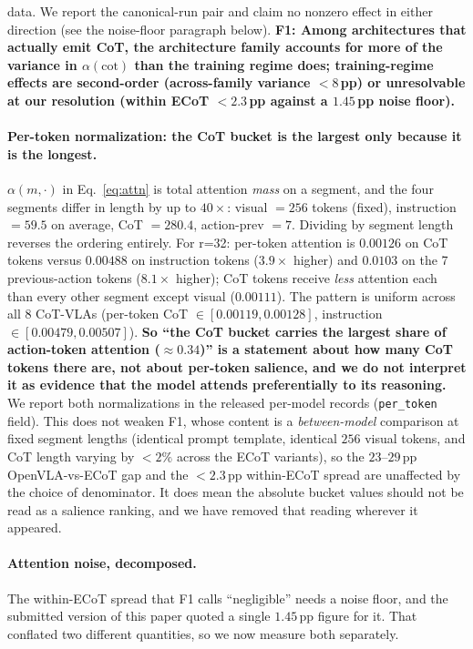 \documentclass{article}
\begin{document}
data. We report the canonical-run pair and claim no nonzero effect in either direction (see the noise-floor paragraph below). \textbf{F1: Among architectures that actually emit CoT, the architecture family accounts for more of the variance in $\alpha(\text{cot})$ than the training regime does; training-regime effects are second-order (across-family variance $<8$\,pp) or unresolvable at our resolution (within ECoT $<2.3$\,pp against a $1.45$\,pp noise floor).}

\paragraph{Per-token normalization: the CoT bucket is the largest only because it is the longest.} $\alpha(m, \cdot)$ in Eq.~\ref{eq:attn} is total attention \emph{mass} on a segment, and the four segments differ in length by up to $40\times$: visual $=256$ tokens (fixed), instruction $=59.5$ on average, CoT $=280.4$, action-prev $=7$. Dividing by segment length reverses the ordering entirely. For \mbox{r=32}: per-token attention is $0.00126$ on CoT tokens versus $0.00488$ on instruction tokens ($3.9\times$ higher) and $0.0103$ on the 7 previous-action tokens ($8.1\times$ higher); CoT tokens receive \emph{less} attention each than every other segment except visual ($0.00111$). The pattern is uniform across all 8 CoT-VLAs (per-token CoT $\in [0.00119, 0.00128]$, instruction $\in [0.00479, 0.00507]$). \textbf{So ``the CoT bucket carries the largest share of action-token attention ($\approx 0.34$)'' is a statement about how many CoT tokens there are, not about per-token salience, and we do not interpret it as evidence that the model attends preferentially to its reasoning.} We report both normalizations in the released per-model records (\texttt{per\_token} field). This does not weaken F1, whose content is a \emph{between-model} comparison at fixed segment lengths (identical prompt template, identical $256$ visual tokens, and CoT length varying by $<2\%$ across the ECoT variants), so the $23$--$29$\,pp OpenVLA-vs-ECoT gap and the $<2.3$\,pp within-ECoT spread are unaffected by the choice of denominator. It does mean the absolute bucket values should not be read as a salience ranking, and we have removed that reading wherever it appeared.

\paragraph{Attention noise, decomposed.} The within-ECoT spread that F1 calls ``negligible'' needs a noise floor, and the submitted version of this paper quoted a single $1.45$\,pp figure for it. That conflated two different quantities, so we now measure both separately.
\end{document}
